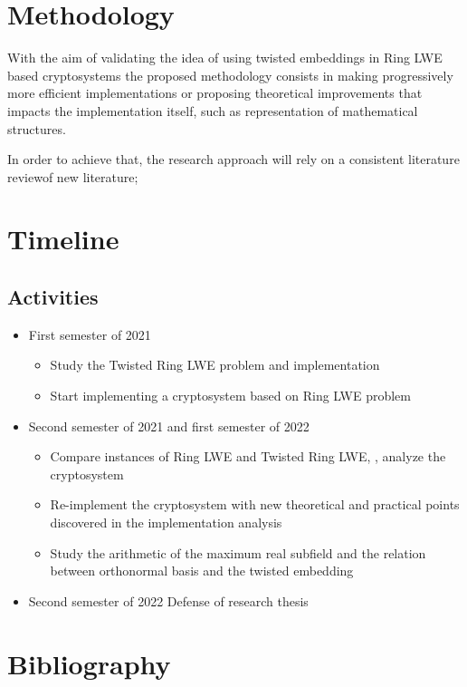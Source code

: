 \documentclass[a4paper,12pt]{article}
\begin{document}
\section{Methodology}
\label{methodology}
With the aim of validating the idea of using twisted embeddings in Ring LWE based cryptosystems the proposed methodology consists in making progressively more efficient implementations or proposing theoretical improvements that impacts the implementation itself, such as representation of mathematical structures.

In order to achieve that, the research approach will rely on a consistent literature reviewof new literature;

\section{Timeline}
\label{timeline}
\subsection{Activities}
\label{sec:orgd7b618d}
\begin{itemize}
\item First semester of 2021
\begin{itemize}
\item Study the Twisted Ring LWE problem and implementation
\item Start implementing a cryptosystem based on Ring LWE problem
\end{itemize}
\item Second semester of 2021 and first semester of 2022
\begin{itemize}
\item Compare instances of Ring LWE and Twisted Ring LWE, \ie, analyze the cryptosystem
\item Re-implement the cryptosystem with new theoretical and practical points discovered in the implementation analysis
\item Study the arithmetic of the maximum real subfield and the relation between orthonormal basis and the twisted embedding
\end{itemize}
\item Second semester of 2022
Defense of research thesis
\end{itemize}

\section*{Bibliography}
\label{bibliography}


\end{document}
